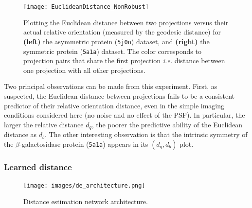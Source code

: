 \begin{figure}
    \centering
    \texttt{[image: EuclideanDistance\_NonRobust]}
    \caption{
        Plotting the Euclidean distance between two projections versus their actual relative orientation (measured by the geodesic distance) for \textbf{(left)} the asymmetric protein (\texttt{5j0n}) dataset, and \textbf{(right)} the symmetric protein (\texttt{5a1a}) dataset. The color corresponds to projection pairs that share the first projection \textit{i.e.} distance between one projection with all other projections.
    }
    \label{fig:euclidean-not-robust}
\end{figure}

Two principal observations can be made from this experiment.
First, as suspected, the Euclidean distance between projections fails to be a consistent predictor of their relative orientation distance, even in the simple imaging conditions considered here (no noise and no effect of the PSF).
In particular, the larger the relative distance $d_q$, the poorer the predictive ability of the Euclidean distance as $d_b$.
The other interesting observation is that the intrinsic symmetry of the $\beta$-galactosidase protein (\texttt{5a1a}) appears in its $(d_q,d_b)$ plot.

\subsubsection{Learned distance}\label{sec:results:distance-estimation:learned}

\begin{figure}
    \centering
    \texttt{[image: images/de\_architecture.png]}
    \caption{Distance estimation network architecture. }
    \label{fig:de-architecture}
\end{figure}


